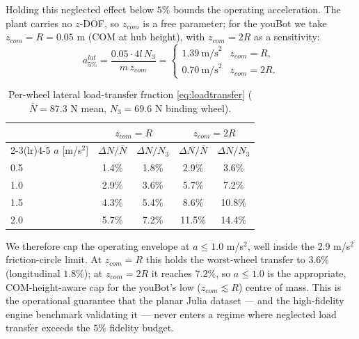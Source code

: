 \documentclass[11pt]{article}
\begin{document}
Holding this neglected effect below $5\%$ bounds the operating acceleration. The
plant carries no $z$-DOF, so $z_{com}$ is a free parameter; for the youBot we take
$z_{com}=R=0.05$ m (COM at hub height), with $z_{com}=2R$ as a sensitivity:
\begin{equation}
a_{5\%}^{lat}=\frac{0.05\cdot4l\,N_3}{m\,z_{com}}=
\begin{cases}1.39\ \text{m/s}^2 & z_{com}=R,\\[2pt]
0.70\ \text{m/s}^2 & z_{com}=2R.\end{cases}
\end{equation}
\begin{table}[h]\centering\small
\begin{tabular}{lcccc}
\toprule
& \multicolumn{2}{c}{$z_{com}=R$} & \multicolumn{2}{c}{$z_{com}=2R$}\\
\cmidrule(lr){2-3}\cmidrule(lr){4-5}
$a$ [m/s$^2$] & $\Delta N/\bar N$ & $\Delta N/N_3$ & $\Delta N/\bar N$ & $\Delta N/N_3$\\
\midrule
0.5 & 1.4\% & 1.8\% & 2.9\% & 3.6\%\\
1.0 & 2.9\% & 3.6\% & 5.7\% & 7.2\%\\
1.5 & 4.3\% & 5.4\% & 8.6\% & 10.8\%\\
2.0 & 5.7\% & 7.2\% & 11.5\% & 14.4\%\\
\bottomrule
\end{tabular}
\caption{Per-wheel lateral load-transfer fraction \eqref{eq:loadtransfer}
($\bar N=87.3$ N mean, $N_3=69.6$ N binding wheel).}
\label{tab:loadtransfer}
\end{table}

We therefore cap the operating envelope at $a\le1.0$ m/s$^2$, well inside the
$2.9$ m/s$^2$ friction-circle limit. At $z_{com}=R$ this holds the worst-wheel
transfer to $3.6\%$ (longitudinal $1.8\%$); at $z_{com}=2R$ it reaches $7.2\%$, so
$a\le1.0$ is the appropriate, COM-height-aware cap for the youBot's low
($z_{com}\!\lesssim\!R$) centre of mass. This is the operational guarantee that
the planar Julia dataset --- and the high-fidelity engine benchmark validating it
--- never enters a regime where neglected load transfer exceeds the $5\%$
fidelity budget.
\end{document}
